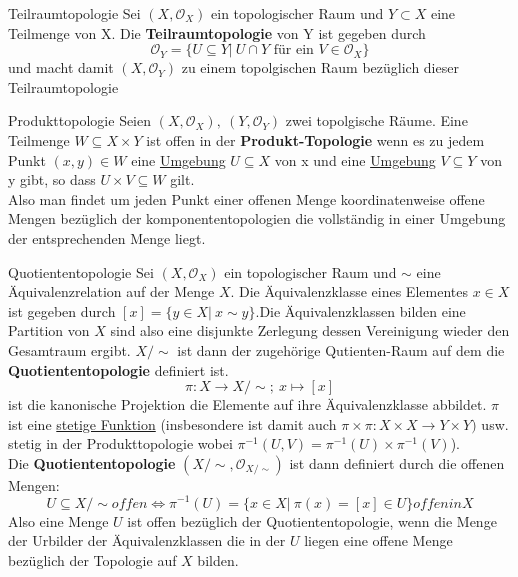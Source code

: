 \begin{titleDef}{Teilraumtopologie}
\label{teilraumTopo}
Sei $(X,\mathcal{O}_X)$ ein topologischer Raum und $Y\subset X$ eine Teilmenge von X. Die \mbox{\textbf{Teilraumtopologie}} von Y ist gegeben durch 
$$\mathcal{O}_Y=\{U\subseteq Y|\ U\cap Y \text{ für ein }V\in\mathcal{O}_X\}$$
und macht damit $(X,\mathcal{O}_Y)$ zu einem topolgischen Raum bezüglich dieser Teilraumtopologie
\end{titleDef}

\begin{titleDef}{Produkttopologie}
\label{produktTopo}
Seien $(X,\mathcal{O}_X),\ (Y,\mathcal{O}_Y)$ zwei topolgische Räume. Eine Teilmenge $W\subseteq X\times Y$ ist offen in der \mbox{\textbf{Produkt-Topologie}} wenn es zu jedem Punkt $(x,y)\in W$ eine \hyperref[Umgebung]{Umgebung} $U\subseteq X$ von x und eine \hyperref[Umgebung]{Umgebung} $V\subseteq Y$ von y gibt, so dass $U\times V\subseteq W$ gilt.\\
Also man findet um jeden Punkt einer offenen Menge koordinatenweise offene Mengen bezüglich der komponententopologien die vollständig in einer Umgebung der entsprechenden Menge liegt.
\end{titleDef}

\begin{titleDef}{Quotiententopologie}
\label{quotTopo}
Sei $(X,\mathcal{O}_X)$ ein topologischer Raum und $\sim$ eine Äquivalenzrelation auf der Menge $X$. Die Äquivalenzklasse eines Elementes $x\in X$ ist gegeben durch $[x]=\{y\in X|\ x\sim y\}$.Die Äquivalenzklassen bilden eine Partition von $X$ sind also eine disjunkte Zerlegung dessen Vereinigung wieder den Gesamtraum ergibt. $X/\sim$ ist dann der zugehörige Qutienten-Raum auf dem die \textbf{Quotiententopologie} definiert ist.
$$\pi:X\to X/\sim;\ x\mapsto[x]$$
ist die kanonische Projektion die Elemente auf ihre Äquivalenzklasse abbildet. $\pi$ ist eine \hyperref[stetig]{stetige Funktion} (insbesondere ist damit auch $\pi\times\pi:X\times X\to Y\times Y)$ usw. stetig in der Produkttopologie wobei $\pi^{-1}(U,V)=\pi^{-1}(U)\times \pi^{-1}(V)$).\\
Die \textbf{Quotiententopologie} $(X/\sim,\mathcal{O}_{X/\sim})$ ist dann definiert durch die offenen Mengen:
$$U\subseteq X/\sim offen \Longleftrightarrow \pi^{-1}(U)=\{x\in X|\ \pi(x)=[x]\in U\} offen in X$$
Also eine Menge $U$ ist offen bezüglich der Quotiententopologie, wenn die Menge der Urbilder der Äquivalenzklassen die in der $U$ liegen eine offene Menge bezüglich der Topologie auf $X$ bilden.
\end{titleDef}


